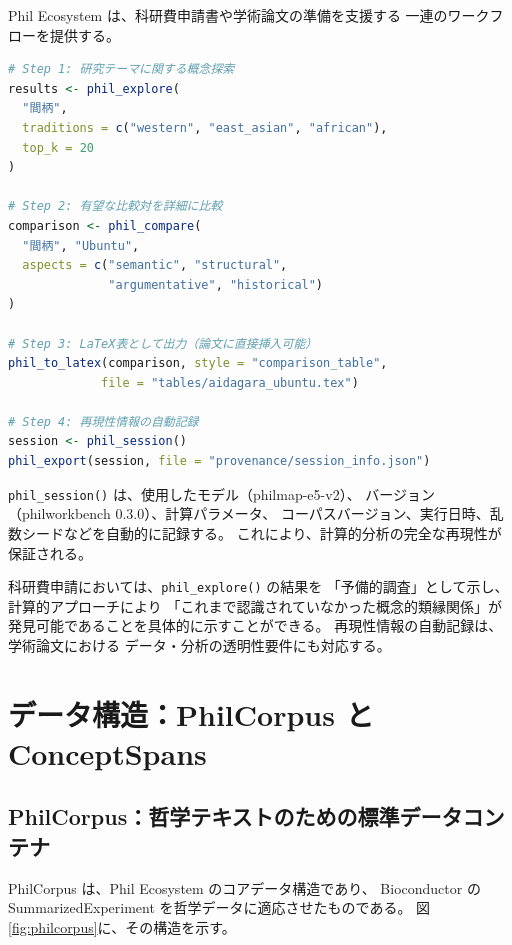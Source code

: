 \documentclass[a4paper,11pt]{ltjsarticle}
\begin{document}
Phil Ecosystem は、科研費申請書や学術論文の準備を支援する
一連のワークフローを提供する。

\begin{lstlisting}[language=R,caption=研究ワークフロー：探索から論文執筆まで]
# Step 1: 研究テーマに関する概念探索
results <- phil_explore(
  "間柄",
  traditions = c("western", "east_asian", "african"),
  top_k = 20
)

# Step 2: 有望な比較対を詳細に比較
comparison <- phil_compare(
  "間柄", "Ubuntu",
  aspects = c("semantic", "structural",
              "argumentative", "historical")
)

# Step 3: LaTeX表として出力（論文に直接挿入可能）
phil_to_latex(comparison, style = "comparison_table",
             file = "tables/aidagara_ubuntu.tex")

# Step 4: 再現性情報の自動記録
session <- phil_session()
phil_export(session, file = "provenance/session_info.json")
\end{lstlisting}

\texttt{phil\_session()} は、使用したモデル（philmap-e5-v2）、
バージョン（philworkbench 0.3.0）、計算パラメータ、
コーパスバージョン、実行日時、乱数シードなどを自動的に記録する。
これにより、計算的分析の完全な再現性が保証される。

科研費申請においては、\texttt{phil\_explore()} の結果を
「予備的調査」として示し、計算的アプローチにより
「これまで認識されていなかった概念的類縁関係」が
発見可能であることを具体的に示すことができる。
再現性情報の自動記録は、学術論文における
データ・分析の透明性要件にも対応する。


\section{データ構造：PhilCorpus と ConceptSpans}\label{sec:data}

\subsection{PhilCorpus：哲学テキストのための標準データコンテナ}

PhilCorpus は、Phil Ecosystem のコアデータ構造であり、
Bioconductor の SummarizedExperiment を哲学データに適応させたものである。
図\ref{fig:philcorpus}に、その構造を示す。
\end{document}
